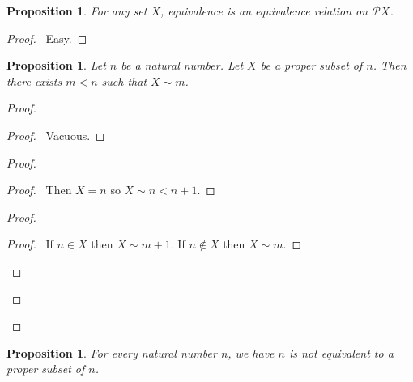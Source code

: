 \documentclass{report}
\let\qed\relax
\newtheorem{prop}[ax]{Proposition}
\theoremstyle{definition}
\begin{document}
\begin{prop}
For any set $X$, equivalence is an equivalence relation on $\mathcal{P} X$.
\end{prop}

\begin{proof}
\pf\ Easy.
\end{proof}

\begin{prop}
\label{prop:subset_finite}
Let $n$ be a natural number. Let $X$ be a proper subset of $n$. Then there exists $m < n$ such that $X \sim m$.
\end{prop}

\begin{proof}
\pf
{}
\begin{proof}
	\pf\ Vacuous.
\end{proof}
\begin{proof}
	\begin{proof}
		\pf\ Then $X = n$ so $X \sim n < n+1$.
	\end{proof}
	\begin{proof}
		\begin{proof}
			\pf\ If $n \in X$ then $X \sim m + 1$. If $n \notin X$ then $X \sim m$.
		\end{proof}
	\end{proof}
\end{proof}
\qed
\end{proof}

\begin{prop}
\label{prop:pigeonhole}
For every natural number $n$, we have $n$ is not equivalent to a proper subset of $n$.
\end{prop}
\end{document}
